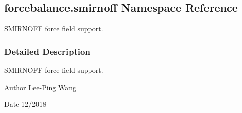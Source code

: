 \hypertarget{namespaceforcebalance_1_1smirnoff}{}\subsection{forcebalance.\+smirnoff Namespace Reference}
\label{namespaceforcebalance_1_1smirnoff}


S\+M\+I\+R\+N\+O\+FF force field support.  




\subsubsection{Detailed Description}
S\+M\+I\+R\+N\+O\+FF force field support. 

\begin{DoxyAuthor}{Author}
Lee-\/\+Ping Wang 
\end{DoxyAuthor}
\begin{DoxyDate}{Date}
12/2018 
\end{DoxyDate}
